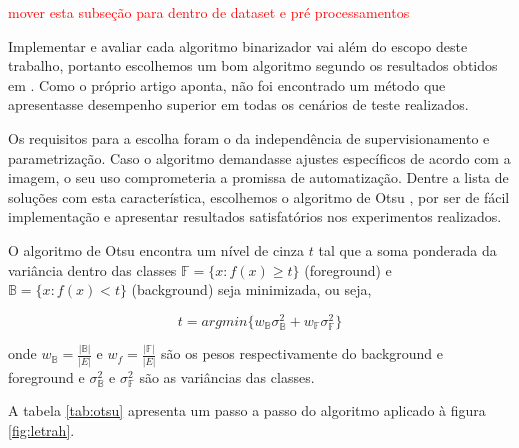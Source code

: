 \documentclass[a4paper,11pt]{article}
\newcommand{\TODO}[1]{\textcolor{red}{#1}}
\begin{document}
    \TODO{mover esta subseção para dentro de dataset e pré processamentos}

    Implementar e avaliar cada algoritmo binarizador vai além do escopo deste trabalho, portanto escolhemos um bom algoritmo segundo os resultados obtidos em \cite{citeulike:890354}. Como o próprio artigo aponta, não foi encontrado um método que apresentasse desempenho superior em todas os cenários de teste realizados.

    Os requisitos para a escolha foram o da independência de supervisionamento e parametrização. Caso o algoritmo demandasse ajustes específicos de acordo com a imagem, o seu uso comprometeria a promissa de automatização. Dentre a lista de soluções com esta característica, escolhemos o algoritmo de Otsu \cite{1979:ots}, por ser de fácil implementação e apresentar resultados satisfatórios nos experimentos realizados.

    O algoritmo de Otsu encontra um nível de cinza $t$ tal que a soma ponderada da variância dentro das classes $\mathbb{F} = \{ x \colon f(x) \geq t \}$ (foreground) e $\mathbb{B} = \{ x \colon f(x) < t \}$ (background) seja minimizada, ou seja,

    \begin{equation}
      t = argmin \{ w_\mathbb{B} \sigma^{2}_{\mathbb{B}} + w_\mathbb{F} \sigma^{2}_{\mathbb{F}} \}
    \end{equation}

    onde $w_\mathbb{B} = \frac{|\mathbb{B}|}{|E|}$ e $w_f = \frac{|\mathbb{F}|}{|E|}$ são os pesos respectivamente do background e foreground e $\sigma^{2}_{\mathbb{B}}$ e $\sigma^{2}_{\mathbb{F}}$ são as variâncias das classes.

    A tabela \ref{tab:otsu} apresenta um passo a passo do algoritmo aplicado à figura \ref{fig:letrah}.
\end{document}
